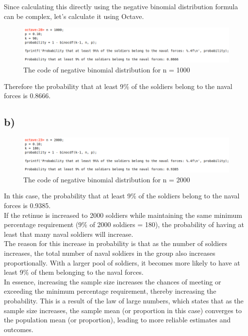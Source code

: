 \documentclass[12pt]{article}
\begin{document}
Since calculating this directly using the negative binomial distribution formula can be complex, let's calculate it using Octave.

\begin{figure}[H]
    \centering
    \includegraphics[scale=0.5]{q3a}
    \caption{The code of negative binomial distribution for n = 1000}
\end{figure}

Therefore the probability that at least 9$\%$ of the soldiers belong to the naval forces is 0.8666.

\subsection*{b)} 

\begin{figure}[H]
    \centering
    \includegraphics[scale=0.5]{q3b}
    \caption{The code of negative binomial distribution for n = 2000}
\end{figure}

In this case, the probability that at least 9$\%$ of the soldiers belong to the naval forces is 0.9385.\\

If the retinue is increased to 2000 soldiers while maintaining the same minimum percentage requirement (9$\%$ of 2000 soldiers = 180), the probability of having at least that many naval soldiers will increase.\\

The reason for this increase in probability is that as the number of soldiers increases, the total number of naval soldiers in the group also increases proportionally. With a larger pool of soldiers, it becomes more likely to have at least 9$\%$ of them belonging to the naval forces.\\

In essence, increasing the sample size increases the chances of meeting or exceeding the minimum percentage requirement, thereby increasing the probability. This is a result of the law of large numbers, which states that as the sample size increases, the sample mean (or proportion in this case) converges to the population mean (or proportion), leading to more reliable estimates and outcomes.\\
\end{document}
